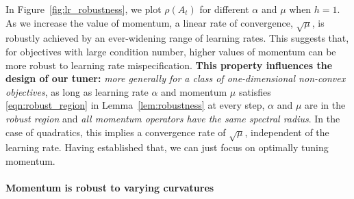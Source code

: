 \documentclass{article} %
\newcommand{\mat}[1]{\bm{\mathit{#1}}}
\begin{document}
In Figure~\ref{fig:lr_robustness}, we plot $\rho(\mat{A}_t)$ for different $\alpha$ and $\mu$ when $h\!=\!1$.
As we increase the value of momentum, a linear rate of convergence, $\sqrt{\mu}$, is robustly achieved by an ever-widening range of learning rates. 
This suggests that, for objectives with large condition number, higher values of momentum can be more robust to learning rate mispecification.
{\bf This property influences the design of our tuner:} \emph{more generally for a class of one-dimensional non-convex objectives}, as long as learning rate $\alpha$ and momentum $\mu$ satisfies \eqref{eqn:robust_region} in Lemma~\ref{lem:robustness} at every step, $\alpha$ and $\mu$ are in the {\em robust region} and 
{\em all momentum operators have the same spectral radius}.
In the case of quadratics, this implies a convergence rate of $\sqrt{\mu}$, independent of the learning rate.
Having established that, we can just focus on optimally tuning momentum.



\paragraph{Momentum is robust to varying curvatures}
\label{sec:curvature_robustness}
\end{document}
